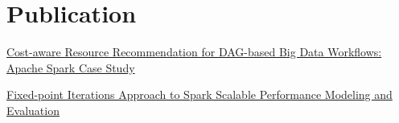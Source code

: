 \documentclass[letterpaper]{deedy-resume} %
\begin{document}
\begin{minipage}[t]{0.66\textwidth}



\section{Publication}

\href{https://ieeexplore.ieee.org/document/9894699}{Cost-aware Resource Recommendation for DAG-based Big Data Workflows: Apache Spark Case Study}

\sectionspace %

\href{https://ieeexplore.ieee.org/document/9573291}{Fixed-point Iterations Approach to Spark Scalable Performance Modeling and Evaluation}



%
%


\end{minipage}
\end{document}
